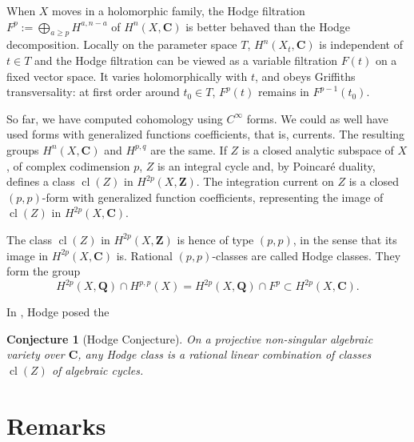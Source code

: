 \documentclass[11pt,a4paper]{article}
\theoremstyle{plain}
\newtheorem{conjecture}[theorem]{Conjecture}
\theoremstyle{definition}
\DeclareMathOperator{\cl}{cl}
\begin{document}
When $X$ moves in a holomorphic family, the Hodge filtration $F^{p} := \bigoplus_{a \geq p} H^{a,n-a}$ of $H^{n}(X,\mathbf{C})$ is better behaved than the Hodge decomposition. Locally on the parameter space $T$, $H^{n}(X_{t},\mathbf{C})$ is independent of $t \in T$ and the Hodge filtration can be viewed as a variable filtration $F(t)$ on a fixed vector space. It varies holomorphically with $t$, and obeys Griffiths transversality: at first order around $t_{0} \in T$, $F^{p}(t)$ remains in $F^{p-1}(t_{0})$.

So far, we have computed cohomology using $C^{\infty}$ forms. We could as well have used forms with generalized functions coefficients, that is, currents. The resulting groups $H^{n}(X,\mathbf{C})$ and $H^{p,q}$ are the same. If $Z$ is a closed analytic subspace of $X$, of complex codimension $p$, $Z$ is an integral cycle and, by Poincar\'e duality, defines a class $\cl(Z)$ in $H^{2p}(X,\mathbf{Z})$. The integration current on $Z$ is a closed $(p,p)$-form with generalized function coefficients, representing the image of $\cl(Z)$ in $H^{2p}(X,\mathbf{C})$.

The class $\cl(Z)$ in $H^{2p}(X,\mathbf{Z})$ is hence of type $(p,p)$, in the sense that its image in $H^{2p}(X,\mathbf{C})$ is. Rational $(p,p)$-classes are called Hodge classes. They form the group
\begin{equation*}
H^{2p}(X,\mathbf{Q}) \cap H^{p,p}(X) = H^{2p}(X,\mathbf{Q}) \cap F^{p} \subset H^{2p}(X,\mathbf{C}).
\end{equation*}

In \cite{hodge1952}, Hodge posed the
\begin{conjecture}[Hodge Conjecture]
On a projective non-singular algebraic variety over $\mathbf{C}$, any Hodge class is a rational linear combination of classes $\cl(Z)$ of algebraic cycles.
\end{conjecture}

\section{Remarks}
\end{document}
